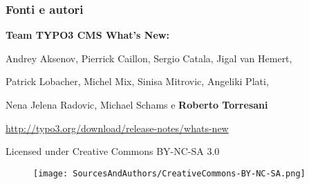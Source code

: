 \begin{frame}[fragile]
	\frametitle{Fonti e autori}

	\vspace{-0.6cm}

	\centerline{\textbf{Team TYPO3 CMS What's New:}}

	\begin{center}
		\centerline{Andrey Aksenov, Pierrick Caillon, Sergio Catala, Jigal van Hemert,}
		\centerline{Patrick Lobacher, Michel Mix, Sinisa Mitrovic, Angeliki Plati,}
		\centerline{Nena Jelena Radovic, Michael Schams e \textbf{Roberto Torresani}}
	\end{center}

	\vspace{0.4cm}

	\smaller\begin{center}\url{http://typo3.org/download/release-notes/whats-new}\end{center}\normalsize

	\vspace{0.8cm}

	\smaller\begin{center}Licensed under Creative Commons BY-NC-SA 3.0\end{center}\normalsize
	\begin{figure}\vspace*{-0.4cm}
		\texttt{[image: SourcesAndAuthors/CreativeCommons-BY-NC-SA.png]}
	\end{figure}

\end{frame}

